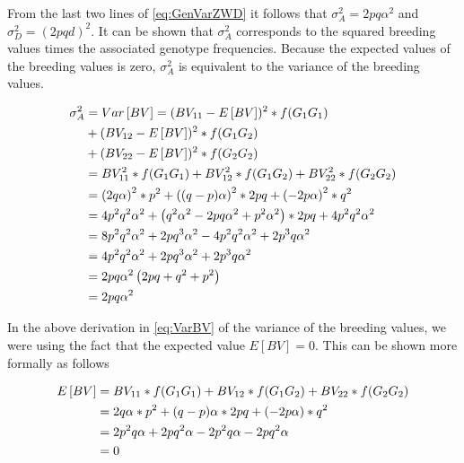 \documentclass[
]{book}
\theoremstyle{definition}
\theoremstyle{definition}
\theoremstyle{definition}
\theoremstyle{remark}
\begin{document}
From the last two lines of \eqref{eq:GenVarZWD} it follows that \(\sigma_A^2 = 2pq\alpha^2\) and \(\sigma_D^2 = \left(2pqd \right)^2\). It can be shown that \(\sigma_A^2\) corresponds to the squared breeding values times the associated genotype frequencies. Because the expected values of the breeding values is zero, \(\sigma_A^2\) is equivalent to the variance of the breeding values.

\begin{align}
\sigma_A^2 &= Var\left[ BV \right] = (BV_{11} - E\left[ BV \right])^2 * f(G_1G_1)  \notag \\
           &   + (BV_{12} - E\left[ BV \right])^2 * f(G_1G_2)  \notag \\
           &   + (BV_{22} - E\left[ BV \right])^2 * f(G_2G_2) \notag \\
           &= BV_{11}^2 * f(G_1G_1) + BV_{12}^2 * f(G_1G_2) + BV_{22}^2 * f(G_2G_2) \notag \\
           &= \left(2q \alpha \right)^2 * p^2 +  \left((q-p) \alpha \right)^2 * 2pq + \left(-2p \alpha \right)^2 * q^2 \notag \\
           &= 4p^2 q^2 \alpha^2 + \left(q^2 \alpha^2 -2pq\alpha^2 + p^2 \alpha^2 \right) * 2pq + 4p^2q^2\alpha^2 \notag \\
           &= 8p^2 q^2 \alpha^2 + 2pq^3\alpha^2 -4p^2q^2\alpha^2 + 2p^3q\alpha^2 \notag \\
           &= 4p^2 q^2 \alpha^2 + 2pq^3\alpha^2  + 2p^3q\alpha^2 \notag \\
           &= 2pq\alpha^2 \left(2pq + q^2 + p^2 \right) \notag \\
           &= 2pq\alpha^2
\label{eq:VarBV}
\end{align}

In the above derivation in \eqref{eq:VarBV} of the variance of the breeding values, we were using the fact that the expected value \(E\left[ BV \right]=0\). This can be shown more formally as follows

\begin{align}
E\left[ BV \right]  &=  BV_{11} * f(G_1G_1) + BV_{12} * f(G_1G_2)  + BV_{22} * f(G_2G_2) \notag \\
                    &=  2q \alpha * p^2 + (q-p) \alpha * 2pq + (-2p \alpha) * q^2 \notag \\
                    &=  2p^2q \alpha + 2pq^2 \alpha - 2p^2q\alpha - 2pq^2\alpha \notag \\
                    &=  0
\label{eq:ExpectedValueBV}
\end{align}
\end{document}
